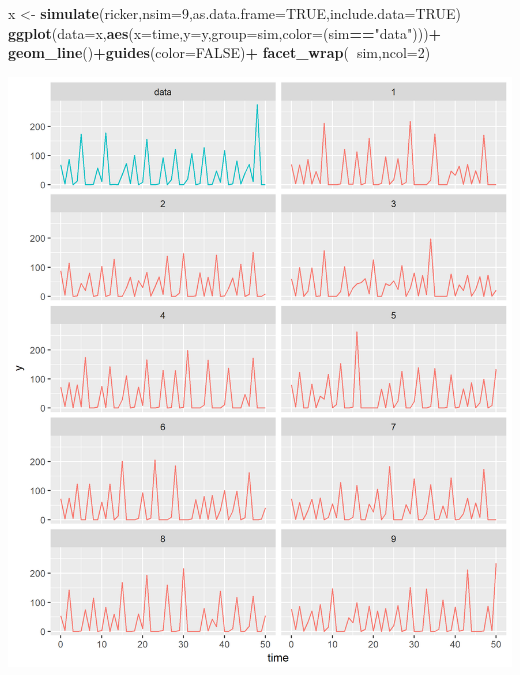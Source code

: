 \documentclass[]{article}
\newenvironment{Shaded}{\begin{snugshade}}{\end{snugshade}}
\newcommand{\KeywordTok}[1]{\textcolor[rgb]{0.13,0.29,0.53}{\textbf{#1}}}
\newcommand{\DataTypeTok}[1]{\textcolor[rgb]{0.13,0.29,0.53}{#1}}
\newcommand{\DecValTok}[1]{\textcolor[rgb]{0.00,0.00,0.81}{#1}}
\newcommand{\StringTok}[1]{\textcolor[rgb]{0.31,0.60,0.02}{#1}}
\newcommand{\OtherTok}[1]{\textcolor[rgb]{0.56,0.35,0.01}{#1}}
\newcommand{\OperatorTok}[1]{\textcolor[rgb]{0.81,0.36,0.00}{\textbf{#1}}}
\newcommand{\NormalTok}[1]{#1}
\begin{document}
\begin{Shaded}
\begin{Highlighting}[]
\NormalTok{x <-}\StringTok{ }\KeywordTok{simulate}\NormalTok{(ricker,}\DataTypeTok{nsim=}\DecValTok{9}\NormalTok{,}\DataTypeTok{as.data.frame=}\OtherTok{TRUE}\NormalTok{,}\DataTypeTok{include.data=}\OtherTok{TRUE}\NormalTok{)}
\KeywordTok{ggplot}\NormalTok{(}\DataTypeTok{data=}\NormalTok{x,}\KeywordTok{aes}\NormalTok{(}\DataTypeTok{x=}\NormalTok{time,}\DataTypeTok{y=}\NormalTok{y,}\DataTypeTok{group=}\NormalTok{sim,}\DataTypeTok{color=}\NormalTok{(sim}\OperatorTok{==}\StringTok{"data"}\NormalTok{)))}\OperatorTok{+}
\StringTok{  }\KeywordTok{geom_line}\NormalTok{()}\OperatorTok{+}\KeywordTok{guides}\NormalTok{(}\DataTypeTok{color=}\OtherTok{FALSE}\NormalTok{)}\OperatorTok{+}
\StringTok{  }\KeywordTok{facet_wrap}\NormalTok{(}\OperatorTok{~}\NormalTok{sim,}\DataTypeTok{ncol=}\DecValTok{2}\NormalTok{)}
\end{Highlighting}
\end{Shaded}

\begin{center}\includegraphics{figure/intro-unnamed-chunk-4-1} \end{center}
\end{document}
